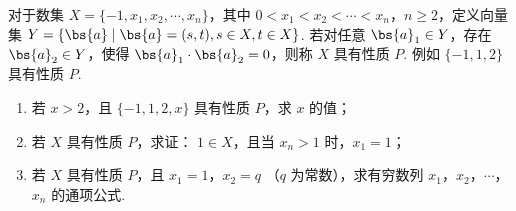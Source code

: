 \begin{problem}
对于数集 \(X = \{-1, x_1, x_2, \cdots, x_n\}\)，其中 \(0 < x_1 < x_2 < \cdots < x_n\)，\(n \geqslant 2\)，定义向量集 \(Y = \{\bs{a} \mid \bs{a} = (s, t), s \in X, t \in X\}\). 若对任意 \(\bs{a}_1 \in Y\)，存在 \(\bs{a}_2 \in Y\)，使得 \(\bs{a}_1 \cdot \bs{a}_2 = 0\)，则称 \(X\) 具有性质 \(P\). 例如 \(\{-1, 1, 2\}\) 具有性质 \(P\).

\begin{enumerate}
\item 若 \(x > 2\)，且 \(\{-1, 1, 2, x\}\) 具有性质 \(P\)，求 \(x\) 的值；
\item 若 \(X\) 具有性质 \(P\)，求证： \(1 \in X\)，且当 \(x_n > 1\) 时，\(x_1 = 1\)；
\item 若 \(X\) 具有性质 \(P\)，且 \(x_{1} = 1\)，\(x_{2} = q\) （\(q\) 为常数），求有穷数列 \(x_{1}\)，\(x_{2}\)，\(\cdots\)，\(x_{n}\) 的通项公式.
\end{enumerate}
\end{problem}

